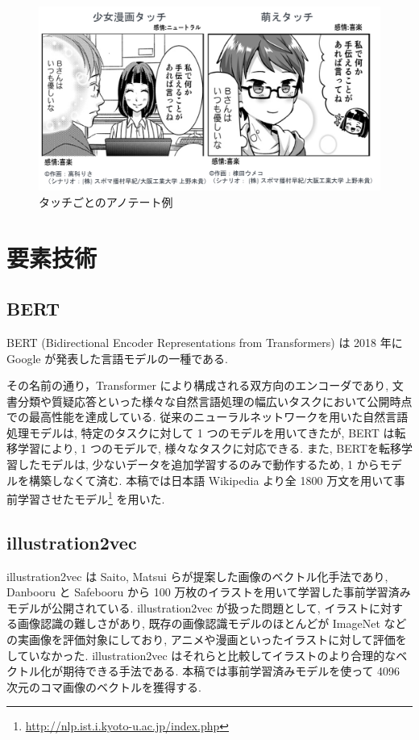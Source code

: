 \documentclass[twocolumn]{jarticle}     %
\begin{document}
\begin{figure}[t]
  \centering
  \includegraphics[width=\linewidth]{4koma.png}
  \caption{タッチごとのアノテート例}
  \label{fig:4koma}
\end{figure}

\section{要素技術}
\subsection{BERT}
BERT (Bidirectional Encoder Representations from Transformers)\cite{BERT} は 2018 年に Google が発表した言語モデルの一種である.

その名前の通り，Transformer により構成される双方向のエンコーダであり, 文書分類や質疑応答といった様々な自然言語処理の幅広いタスクにおいて公開時点での最高性能を達成している.
従来のニューラルネットワークを用いた自然言語処理モデルは, 特定のタスクに対して 1 つのモデルを用いてきたが, BERT は転移学習により, 1 つのモデルで, 様々なタスクに対応できる. また, BERTを転移学習したモデルは, 少ないデータを追加学習するのみで動作するため, 1 からモデルを構築しなくて済む. 本稿では日本語 Wikipedia より全 1800 万文を用いて事前学習させたモデル\footnote{\url{http://nlp.ist.i.kyoto-u.ac.jp/index.php}} を用いた.

\newpage

\subsection{illustration2vec}
illustration2vec\cite{i2v} は Saito, Matsui らが提案した画像のベクトル化手法であり, Danbooru と Safebooru から 100 万枚のイラストを用いて学習した事前学習済みモデルが公開されている. illustration2vec が扱った問題として, イラストに対する画像認識の難しさがあり, 既存の画像認識モデルのほとんどが ImageNet などの実画像を評価対象にしており, アニメや漫画といったイラストに対して評価をしていなかった. illustration2vec はそれらと比較してイラストのより合理的なベクトル化が期待できる手法である. 本稿では事前学習済みモデルを使って 4096 次元のコマ画像のベクトルを獲得する.
\end{document}
